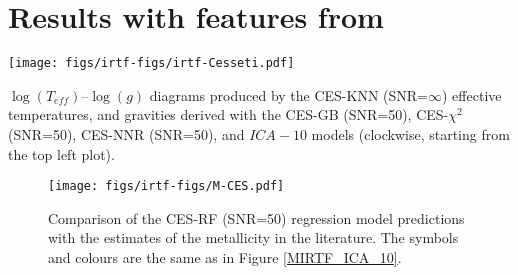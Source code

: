
\begin{appendix}
\label{app:figures}
  \section{Results with features from \cite{cesetti}}
\label{app:figures:irtf}


\begin {figure*}
 \centering
  \texttt{[image: figs/irtf-figs/irtf-Cesseti.pdf]}
  \caption{$\log(T_{eff})$--$\log(g)$ diagrams produced by the CES-KNN
    (SNR=$\infty$) effective temperatures, and gravities derived with
    the CES-GB (SNR=50), CES-$\chi^2$ (SNR=50), CES-NNR (SNR=50), and $ICA-10$
    models (clockwise, starting from the top left plot).}
 \label{fig:irtf-ces}
\end {figure*}



\begin {figure}
\centering
\texttt{[image: figs/irtf-figs/M-CES.pdf]}
\caption{Comparison of the CES-RF (SNR=50) regression model
  predictions with the estimates of the metallicity in the
  literature. The symbols and colours are the same as in Figure
  \ref{MIRTF_ICA_10}.}
\label{fig:irtf-ces-met}
\end {figure}

\end{appendix}

